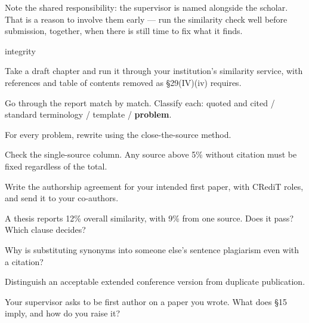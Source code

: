 Note the shared responsibility: the supervisor is named alongside the scholar.
That is a reason to involve them early --- run the similarity check well before
submission, together, when there is still time to fix what it finds.

\begin{traditions}{integrity}
\end{traditions}

\begin{lab}
\begin{tightnum}
  \item Take a draft chapter and run it through your institution's similarity
    service, with references and table of contents removed as \S29(IV)(iv)
    requires.
  \item Go through the report match by match. Classify each: quoted and cited /
    standard terminology / template / \textbf{problem}.
  \item For every problem, rewrite using the close-the-source method.
  \item Check the single-source column. Any source above 5\% without citation
    must be fixed regardless of the total.
  \item Write the authorship agreement for your intended first paper, with
    CRediT roles, and send it to your co-authors.
\end{tightnum}
\end{lab}

\begin{checkpoint}
\begin{tightnum}
  \item A thesis reports 12\% overall similarity, with 9\% from one source.
    Does it pass? Which clause decides?
  \item Why is substituting synonyms into someone else's sentence plagiarism
    even with a citation?
  \item Distinguish an acceptable extended conference version from duplicate
    publication.
  \item Your supervisor asks to be first author on a paper you wrote. What does
    \S15 imply, and how do you raise it?
\end{tightnum}
\end{checkpoint}

